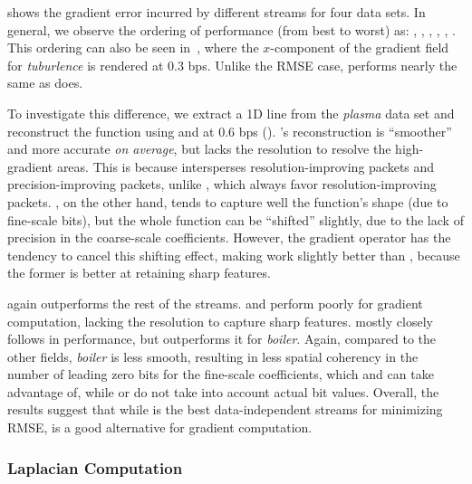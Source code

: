  shows the gradient error incurred by different streams for four
data sets. In general, we observe the ordering of performance (from best to worst) as: \sgop, \sgsg,
\sbit, \swav, \smag, \slvl. This ordering can also be seen in~,
where the $x$-component of the gradient field for \emph{tuburlence} is rendered at 0.3 bps. Unlike
the RMSE case, \sbit performs nearly the same as \swav does.

To investigate this difference, we extract a 1D line from the \emph{plasma} data set and reconstruct
the function using \sbit and \swav at 0.6 bps
(). \swav's reconstruction is ``smoother'' and more
accurate \emph{on average}, but lacks the resolution to resolve the high-gradient areas. This is
because \swav intersperses resolution-improving packets and precision-improving packets, unlike
\sbit, which always favor resolution-improving packets. \sbit, on the other hand, tends to capture
well the function's shape (due to fine-scale bits), but the whole function can be ``shifted''
slightly, due to the lack of precision in the coarse-scale coefficients. However, the gradient
operator has the tendency to cancel this shifting effect, making \sbit work slightly better than
\swav, because the former is better at retaining sharp features.

\sgop again outperforms the rest of the streams. \slvl and \smag perform poorly for gradient
computation, lacking the resolution to capture sharp features. \sgsg mostly closely follows \sbit in
performance, but outperforms it for \emph{boiler}. Again, compared to the other fields,
\emph{boiler} is less smooth, resulting in less spatial coherency in the number of leading zero bits
for the fine-scale coefficients, which \sgop and \sgsg can take advantage of, while \swav or \sbit
do not take into account actual bit values. Overall, the results suggest that while \swav is the
best data-independent streams for minimizing RMSE, \sbit is a good alternative for gradient
computation.

\subsubsection{Laplacian Computation}\label{sec:laplacian}

